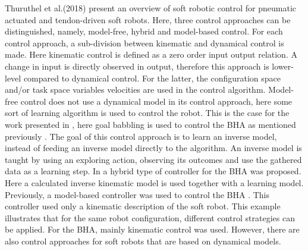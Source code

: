 Thuruthel et al.(2018) \cite{george2018control} present an overview of soft robotic control for pneumatic actuated and tendon-driven soft robots. Here, three control approaches can be distinguished, namely, model-free, hybrid and model-based control. For each control approach, a sub-division between kinematic and dynamical control is made. Here kinematic control is defined as a zero order input output relation. A change in input is directly observed in output, therefore this approach is lower-level compared to dynamical control. For the latter, the configuration space and/or task space variables velocities are used in the control algorithm. Model-free
control does not use a dynamical model in its control approach, here some sort of learning algorithm is used to control the robot. This is the case for the work presented in \cite{rolf2013efficient}, here goal babbling is used to control the BHA as mentioned previously \cite{rolf2012constant}. The goal of this control approach is to learn an inverse model, instead of feeding an inverse model directly to the algorithm. An inverse model is taught by using an exploring action, observing its outcomes and use the gathered data as a learning step. In \cite{reinhart2017hybrid} a hybrid type of controller for the BHA was proposed. Here a calculated inverse kinematic model is used together with a learning model. Previously, a model-based controller was used to control the BHA \cite{mahl2014bhakin}. This controller used only a kinematic description of the soft robot. This example illustrates that for the same robot configuration, different control strategies can be applied. For the BHA, mainly kinematic control was used. However, there are also control approaches for soft robots that are based on dynamical models. 















